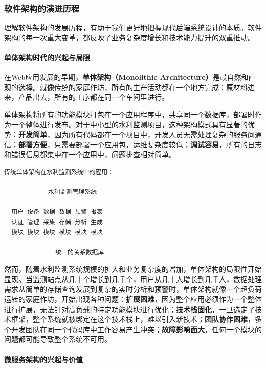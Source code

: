 \subsubsection{软件架构的演进历程}\label{ux8f6fux4ef6ux67b6ux6784ux7684ux6f14ux8fdbux5386ux7a0b}

理解软件架构的发展历程，有助于我们更好地把握现代后端系统设计的本质。软件架构的每一次重大变革，都反映了业务复杂度增长和技术能力提升的双重推动。

\paragraph{单体架构时代的兴起与局限}\label{ux5355ux4f53ux67b6ux6784ux65f6ux4ee3ux7684ux5174ux8d77ux4e0eux5c40ux9650}

在Web应用发展的早期，\textbf{单体架构（Monolithic Architecture）}是最自然和直观的选择。就像传统的家庭作坊，所有的生产活动都在一个地方完成：原材料进来，产品出去，所有的工序都在同一个车间里进行。

单体架构将所有的功能模块打包在一个应用程序中，共享同一个数据库，部署时作为一个整体进行发布。对于中小型的水利监测项目，这种架构模式具有显著的优势：\textbf{开发简单}，因为所有代码都在一个项目中，开发人员无需处理复杂的服务间通信；\textbf{部署方便}，只需要部署一个应用包，运维复杂度较低；\textbf{调试容易}，所有的日志和错误信息都集中在一个应用中，问题排查相对简单。

\begin{verbatim}
传统单体架构在水利监测系统中的应用：

            水利监测管理系统              
    
  用户 设备 数据 数据 预警 报表   
  认证 管理 采集 存储 分析 生成   
  模块 模块 模块 模块 模块 模块   
    
              统一的关系数据库            
\end{verbatim}

然而，随着水利监测系统规模的扩大和业务复杂度的增加，单体架构的局限性开始显现。当监测站点从几十个增长到几千个，用户从几十人增长到几千人，数据处理需求从简单的存储查询发展到复杂的实时分析和预警时，单体架构就像一个超负荷运转的家庭作坊，开始出现各种问题：\textbf{扩展困难}，因为整个应用必须作为一个整体进行扩展，无法针对高负载的特定功能模块进行优化；\textbf{技术栈固化}，一旦选定了技术框架，整个系统就被绑定在这个技术栈上，难以引入新技术；\textbf{团队协作困难}，多个开发团队在同一个代码库中工作容易产生冲突；\textbf{故障影响面大}，任何一个模块的问题都可能导致整个系统不可用。

\paragraph{微服务架构的兴起与价值}\label{ux5faeux670dux52a1ux67b6ux6784ux7684ux5174ux8d77ux4e0eux4ef7ux503c}

